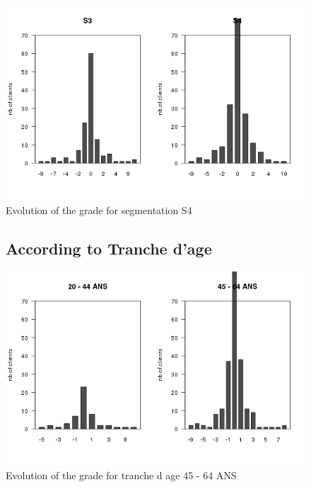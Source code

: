 \documentclass[a4paper, 11pt]{article}
\begin{document}
        \begin{figure}[!ht]
                \centering
                \includegraphics[height = 10 cm]{Remi/Evolution_of_the_grade_for_segmentation_S4.png}
                \caption{Evolution of the grade for segmentation S4}
                \label{fig:e_seg_S4}
        \end{figure}

        \begin{figure}[!ht]
				\subsection{According to Tranche d'age}
                \centering
                \includegraphics[height = 10 cm]{Remi/Evolution_of_the_grade_for_tranche_d_age_45 - 64 ANS.png}
                \caption{Evolution of the grade for tranche d age 45 - 64 ANS}
                \label{fig:e_age_45 - 64 ANS}
        \end{figure}
\end{document}
